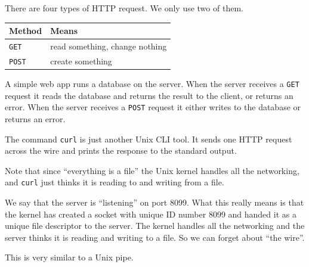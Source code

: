 \documentclass[aspectratio=169,12pt]{beamer}
\begin{document}
\begin{frame}
\vfill
\begin{center}
\begin{minipage}{0.92\textwidth}
\raggedright
\large

There are four types of HTTP request. We only use two of them.

\medskip

\begin{center}
\begin{tabular}{ll}
\toprule
\textbf{Method} & \textbf{Means} \\
\midrule
\texttt{GET}  & read something, change nothing \\
\texttt{POST} & create something \\
\bottomrule
\end{tabular}
\end{center}

\medskip

A simple web app runs a database on the server. When the server receives a \texttt{GET} request it
reads the database and returns the result to the client, or returns an error. When the server
receives a \texttt{POST} request it either writes to the database or returns an error.

\end{minipage}
\end{center}
\vfill
\end{frame}

\begin{frame}
\vfill
\begin{center}
\begin{minipage}{0.92\textwidth}
\raggedright

The command \texttt{curl} is just another Unix CLI tool. It sends one HTTP request across the wire
and prints the response to the standard output.

\medskip

Note that since ``everything is a file'' the Unix kernel handles all the networking, and
\texttt{curl} just thinks it is reading to and writing from a file.

\medskip

We say that the server is ``listening'' on port 8099. What this really means is that the kernel
has created a socket with unique ID number 8099 and handed it as a unique file descriptor to the
server. The kernel handles all the networking and the server thinks it is reading and writing to a
file. So we can forget about ``the wire''.

\medskip

This is very similar to a Unix pipe.

\end{minipage}
\end{center}
\vfill
\end{frame}
\end{document}
